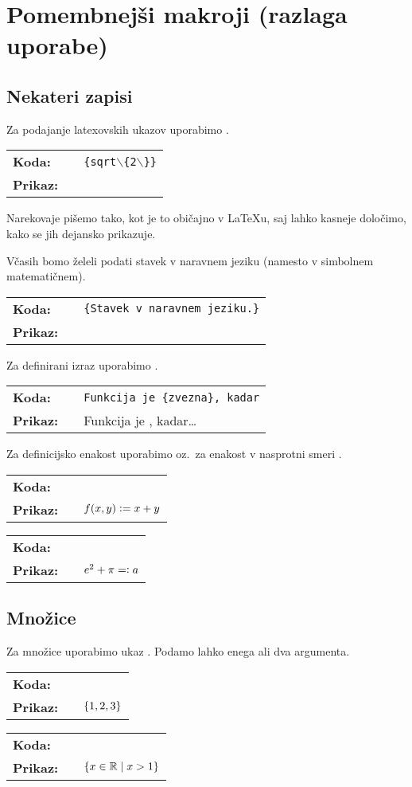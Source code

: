 \chapter*{Pomembnejši makroji (razlaga uporabe)}


\newcommand{\ponazoritev}[2]{

\medskip
\begin{tabular}{lll}
\textbf{Koda:} && \texttt{#1} \\[1ex]
\textbf{Prikaz:} && {#2}
\end{tabular}
\bigskip

}

\section*{Nekateri zapisi}

Za podajanje latexovskih ukazov uporabimo . 
\ponazoritev{\ltc{ltc}\{sqrt$\backslash$\{2$\backslash$\}\}}{\ltc{sqrt\{2\}}}

Narekovaje pišemo tako, kot je to običajno v {\LaTeX}u, saj lahko kasneje določimo, kako
se jih dejansko prikazuje.

Včasih bomo želeli podati stavek v naravnem jeziku (namesto v simbolnem matematičnem).
\ponazoritev{\ltc{nls}\{Stavek v naravnem jeziku.\}}{\nls{Stavek v naravnem jeziku.}}

Za definirani izraz uporabimo .
\ponazoritev{Funkcija je \ltc{df}\{zvezna\}, kadar\ltc{ldots}}{Funkcija je \df{zvezna}, kadar\ldots}

Za definicijsko enakost uporabimo  oz.~za enakost v nasprotni smeri .
\ponazoritev{\textdollar{f(x,y) \ltc{dfeq} x + y}\textdollar}{$f(x,y) \mathrel{\mathop:}= x + y$}
\ponazoritev{\textdollar{e\^{}2 + \ltc{pi} \ltc{revdfeq} a}\textdollar}{$e^2 + \pi =\mathrel{\mathop:} a$}

\section*{Množice}

Za množice uporabimo ukaz . Podamo lahko enega ali dva argumenta.
\ponazoritev{\textdollar{\ltc{set}\{1,2,3\}}\textdollar}{$\set{1,2,3}$}
\ponazoritev{\textdollar{\ltc{set}\{x \ltc{in} \ltc{RR}\}\{x > 1\}}\textdollar}{$\set{x \in \RR}{x > 1}$}

